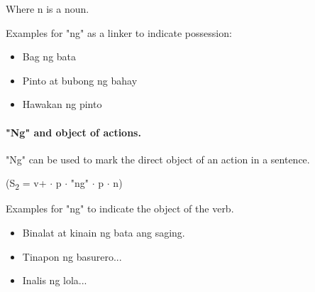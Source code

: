 Where n is a noun. \\

\begin{example}
      Examples for "ng" as a linker to indicate possession:
\end{example}
\begin{itemize}
      \item Bag ng bata
      \item Pinto at bubong ng bahay
      \item Hawakan ng pinto
\end{itemize}

\paragraph{"Ng" and object of actions.}"Ng" can be used to mark the direct object
of an action in a sentence.
\begin{center}
      (S\textsubscript{2} = v+ \(\cdot\) p \(\cdot\) "ng" \(\cdot\) p \(\cdot\) n)
\end{center}

\begin{example}
      Examples for "ng" to indicate the object of the verb.
\end{example}
\begin{itemize}
      \item Binalat at kinain ng bata ang saging.
      \item Tinapon ng basurero...
      \item Inalis ng lola...
\end{itemize}

